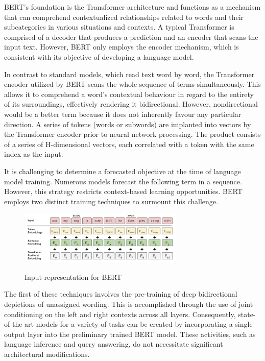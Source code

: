 BERT's foundation is the Transformer architecture and functions as a mechanism that can comprehend contextualized relationships related to words and their subcategories in various situations and contexts. A typical Transformer is comprised of a decoder that produces a prediction and an encoder that scans the input text. However, BERT only employs the encoder mechanism, which is consistent with its objective of developing a language model.


In contrast to standard models, which read text word by word, the Transformer encoder utilized by BERT scans the whole sequence of terms simultaneously. This allows it to comprehend a word's contextual behaviour in regard to the entirety of its surroundings, effectively rendering it bidirectional. However, nondirectional would be a better term because it does not inherently favour any particular direction.
A series of tokens (words or subwords) are implanted into vectors by the Transformer encoder prior to neural network processing. The product consists of a series of H-dimensional vectors, each correlated with a token with the same index as the input.

It is challenging to determine a forecasted objective at the time of language model training. Numerous models forecast the following term in a sequence. However, this strategy restricts context-based learning opportunities. BERT employs two distinct training techniques to surmount this challenge.

\begin{figure}[!h]
    \centering
    \includegraphics[width=0.7\textwidth]{images/nsp.png}
    \label{fig:nsp}
    \caption{Input representation for BERT\cite{BERT}}
\end{figure}


The first of these techniques involves the pre-training of deep bidirectional depictions of unassigned wording. This is accomplished through the use of joint conditioning on the left and right contexts across all layers. Consequently, state-of-the-art models for a variety of tasks can be created by incorporating a single output layer into the preliminary trained BERT model. These activities, such as language inference and query answering, do not necessitate significant architectural modifications.

